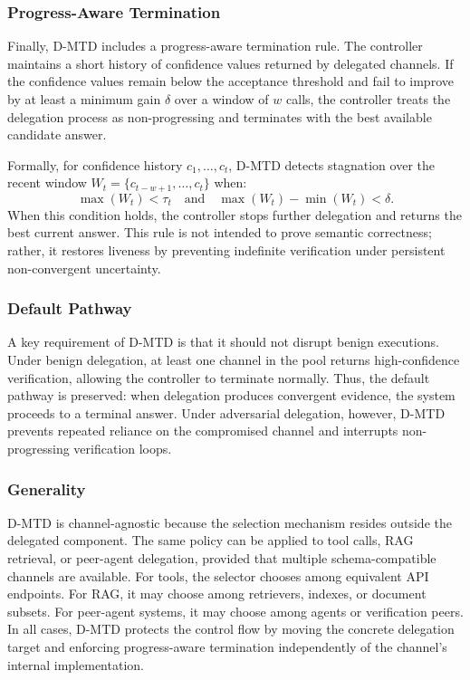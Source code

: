 \documentclass[conference]{IEEEtran}
\begin{document}
\subsubsection{Progress-Aware Termination}

Finally, D-MTD includes a progress-aware termination rule. The controller maintains a short history of confidence values returned by delegated channels. If the confidence values remain below the acceptance threshold and fail to improve by at least a minimum gain $\delta$ over a window of $w$ calls, the controller treats the delegation process as non-progressing and terminates with the best available candidate answer.

Formally, for confidence history $c_1, \ldots, c_t$, D-MTD detects stagnation over the recent window $W_t = \{c_{t-w+1}, \ldots, c_t\}$ when:
\[
\max(W_t) < \tau_t
\quad \text{and} \quad
\max(W_t) - \min(W_t) < \delta.
\]
When this condition holds, the controller stops further delegation and returns the best current answer. This rule is not intended to prove semantic correctness; rather, it restores liveness by preventing indefinite verification under persistent non-convergent uncertainty.

\subsubsection{Default Pathway}

A key requirement of D-MTD is that it should not disrupt benign executions. Under benign delegation, at least one channel in the pool returns high-confidence verification, allowing the controller to terminate normally. Thus, the default pathway is preserved: when delegation produces convergent evidence, the system proceeds to a terminal answer. Under adversarial delegation, however, D-MTD prevents repeated reliance on the compromised channel and interrupts non-progressing verification loops.

\subsubsection{Generality}

D-MTD is channel-agnostic because the selection mechanism resides outside the delegated component. The same policy can be applied to tool calls, RAG retrieval, or peer-agent delegation, provided that multiple schema-compatible channels are available. For tools, the selector chooses among equivalent API endpoints. For RAG, it may choose among retrievers, indexes, or document subsets. For peer-agent systems, it may choose among agents or verification peers. In all cases, D-MTD protects the control flow by moving the concrete delegation target and enforcing progress-aware termination independently of the channel's internal implementation.
\end{document}
